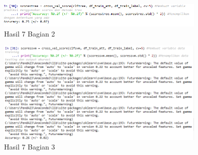 
\begin{figure}[H]
\centerline{\includegraphics[width=10cm]{figures/1174077/3/32.png}}
\caption{Hasil 7 Bagian 2}
\label{labelgambar}
\end{figure}


\begin{figure}[H]
\centerline{\includegraphics[width=10cm]{figures/1174077/3/33.png}}
\caption{Hasil 7 Bagian 3}
\label{labelgambar}
\end{figure}

